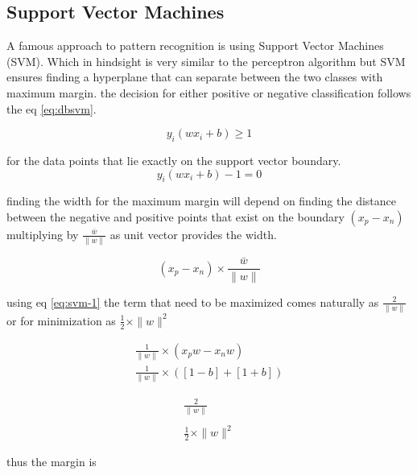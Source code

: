 \documentclass[10pt,twocolumn,letterpaper]{article}
\begin{document}
\subsection{Support Vector Machines}

A famous approach to pattern recognition is using Support Vector Machines (SVM). Which in hindsight is very similar to the perceptron algorithm but SVM ensures finding a hyperplane  that can separate between the two classes with maximum margin. the decision for either positive or negative classification follows the eq \ref{eq:dbsvm}. 


\begin{equation}
y_{i}\left(w x_{i}+b\right) \geq 1
\label{eq:dbsvm}
\end{equation}

for the data points that lie exactly on the support vector boundary. 
\begin{equation}
y_{i}\left(w x_{i}+b\right)-1=0
\label{eq:svm-1}
\end{equation}

finding the width for the maximum margin will depend on finding the distance between the negative and positive points that exist on the boundary $\left(x_{p}-x_{n}\right)$ multiplying by $\frac{\bar{w}}{\|w\|}$ as unit vector provides the width. 

\begin{equation}
\left(x_{p}-x_{n}\right) \times \frac{\bar{w}}{\|w\|}
\end{equation}

using eq \ref{eq:svm-1} the term that need to be maximized comes naturally as $\frac{2}{\|w\|}$ or for minimization as $\frac{1}{2} \times\|w\|^{2}$

\begin{equation}
\begin{array}{l}
\frac{1}{\|w\|} \times\left(x_{p} w-x_{n} w\right) \\
\frac{1}{\|w\|} \times([1-b]+[1+b])
\end{array}
\end{equation}


\begin{equation}
\begin{array}{l}
\frac{2}{\|w\|} \\ \\
\frac{1}{2} \times\|w\|^{2}
\end{array}
\end{equation}


thus the margin is 
\end{document}
